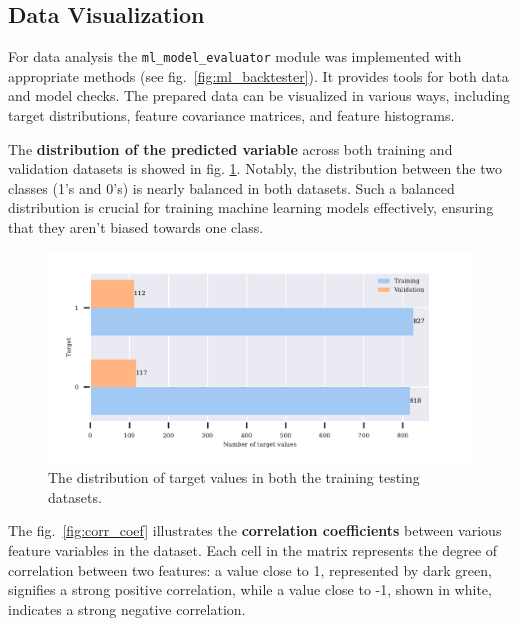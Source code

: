 \subsection{Data Visualization}
For data analysis the \texttt{ml\_model\_evaluator} module was implemented with appropriate methods (see fig.~\ref{fig:ml_backtester}).
It provides tools for both data and model checks.
The prepared data can be visualized in various ways, including target distributions, feature covariance matrices, and feature histograms.

The \textbf{distribution of the predicted variable} across both training and validation datasets is showed in fig. \ref{fig:signal_distribution}.
Notably, the distribution between the two classes (1's and 0's) is nearly balanced in both datasets.
Such a balanced distribution is crucial for training machine learning models effectively, ensuring that they aren't biased towards one class.

\begin{figure}[h]
\centering
\begin{adjustbox}{max width=1\textwidth,center}
    \includegraphics[scale=1]{./pdf/report/sig_distr.pdf}
\end{adjustbox}
    \caption{The distribution of target values in both the training testing datasets.}
\label{fig:signal_distribution}
\end{figure}

The fig.~\ref{fig:corr_coef} illustrates the \textbf{correlation coefficients} between various feature variables in the dataset.
Each cell in the matrix represents the degree of correlation between two features: a value close to 1, represented by dark green, signifies a strong positive correlation, while a value close to -1, shown in white, indicates a strong negative correlation.

